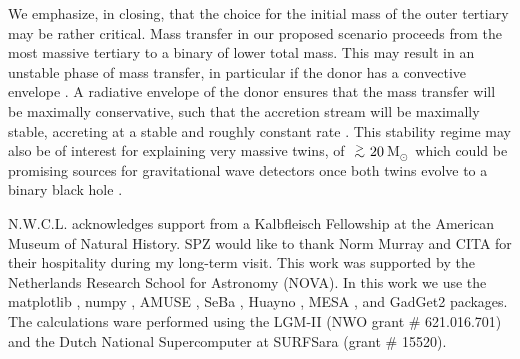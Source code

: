 \documentclass[twocolumn]{aastex62}
\newcommand{\MSun}{\mbox{M$_\odot$}}
\def\apgt{\ {\raise-.5ex\hbox{$\buildrel>\over\sim$}}\ }
\def\simon#1{{\bf {\color{red}[#1 -- Simon]}}}
\begin{document}
\begin{enumerate}

\end{enumerate}

We emphasize, in closing, that the choice for the initial mass of the
outer tertiary may be rather critical.  Mass transfer in our proposed
scenario proceeds from the most massive tertiary to a binary of lower
total mass. This may result in an unstable phase of mass transfer, in
particular if the donor has a convective envelope
\citep[e.g.][]{2009pfer.book.....M}. A radiative envelope of the donor
ensures that the mass transfer will be maximally conservative, such
that the accretion stream will be maximally stable, accreting at a
stable and roughly constant rate \citep[e.g.][]{1991ApJS...76...55I}.
This stability regime may also be of interest for explaining very
massive twins, of $\apgt 20$\,\MSun\, which could be promising sources
for gravitational wave detectors once both twins evolve to a binary
black hole \citep{2016MNRAS.460.3545D}.

\acknowledgments

N.W.C.L. acknowledges support from a Kalbfleisch Fellowship at the
American Museum of Natural History.  SPZ would like to thank Norm
Murray and CITA for their hospitality during my long-term visit.  This
work was supported by the Netherlands Research School for Astronomy
(NOVA). 
In this work we use the matplotlib
\citep{2007CSE.....9...90H}, numpy
\citep{Oliphant2006ANumPy}, AMUSE
\citep{portegies_zwart_simon_2018_1443252}, SeBa
\citep{2012ascl.soft01003P}, Huayno \citep{2012NewA...17..711P}, MESA
\citep{2010ascl.soft10083P}, and GadGet2 \citep{2000ascl.soft03001S}
packages. The calculations ware performed using the LGM-II (NWO grant
\# 621.016.701) and the Dutch National Supercomputer at SURFSara
(grant \# 15520).





%
% 
%      
\end{document}
